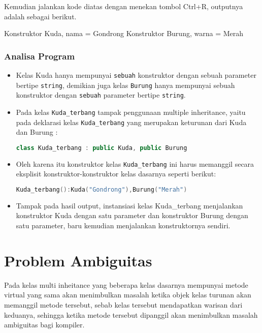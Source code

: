 Kemudian jalankan kode diatas dengan menekan tombol Ctrl+R, outputnya
adalah sebagai berikut.

\begin{lcverbatim}
Konstruktor Kuda, nama = Gondrong
Konstruktor Burung, warna = Merah
\end{lcverbatim}

\subsubsection*{Analisa Program}

\begin{itemize}
\item
  Kelas Kuda hanya mempunyai \texttt{sebuah} konstruktor dengan sebuah
  parameter bertipe \texttt{string}, demikian juga kelas \texttt{Burung}
  hanya mempunyai sebuah konstruktor dengan \texttt{sebuah} parameter
  bertipe \texttt{string}.
\item
  Pada kelas \texttt{Kuda\_terbang} tampak penggunaan multiple
  inheritance, yaitu pada deklarasi kelas \texttt{Kuda\_terbang} yang
  merupakan keturunan dari Kuda dan Burung :

\begin{lstlisting}[language=c++, numbers=none]
class Kuda_terbang : public Kuda, public Burung
\end{lstlisting}
\item
  Oleh karena itu konstruktor kelas \texttt{Kuda\_terbang} ini harus
  memanggil secara eksplisit konstruktor-konstruktor kelas dasarnya
  seperti berikut:

\begin{lstlisting}[language=c++, numbers=none]
Kuda_terbang():Kuda("Gondrong"),Burung("Merah")
\end{lstlisting}
\item
  Tampak pada hasil output, instansiasi kelas Kuda\_terbang menjalankan
  konstruktor Kuda dengan satu parameter dan konstruktor Burung dengan
  satu parameter, baru kemudian menjalankan konstruktornya sendiri.
\end{itemize}

\section{Problem Ambiguitas}\label{problem-ambiguitas}

Pada kelas multi inheitance yang beberapa kelas dasarnya mempunyai
metode virtual yang sama akan menimbulkan masalah ketika objek kelas
turunan akan memanggil metode tersebut, sebab kelas tersebut mendapatkan
warisan dari keduanya, sehingga ketika metode tersebut dipanggil akan
menimbulkan masalah ambiguitas bagi kompiler.

